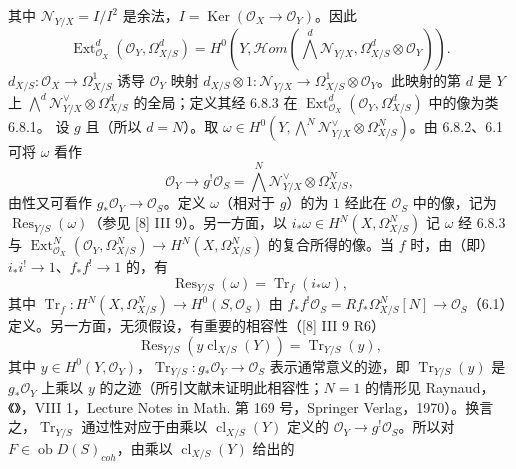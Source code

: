 其中 $\mathcal N_{Y/X}=I/I^2$ 是余法，$I=\operatorname{Ker}(\mathcal O_X\to\mathcal O_Y)$。因此
\[\operatorname{Ext}_{\mathcal O_X}^d(\mathcal O_Y,\Omega^d_{X/S})=H^0(Y,\mathcal Hom(\bigwedge^d\mathcal N_{Y/X},\Omega^d_{X/S}\otimes\mathcal O_Y)).\tag{6.8.3}\]
 $d_{X/S}:\mathcal O_X\to\Omega^1_{X/S}$ 诱导 $\mathcal O_Y$ 映射 $d_{X/S}\otimes1:\mathcal N_{Y/X}\to\Omega^1_{X/S}\otimes\mathcal O_Y$。此映射的第 $d$ 是 $Y$ 上 $\bigwedge^d\mathcal N_{Y/X}^{\vee}\otimes\Omega^d_{X/S}$ 的全局；定义其经 6.8.3 在 $\operatorname{Ext}_{\mathcal O_X}^d(\mathcal O_Y,\Omega^d_{X/S})$ 中的像为类 6.8.1。
设 $g$ 且（所以 $d=N$）。取 $\omega\in H^0(Y,\bigwedge^N\mathcal N_{Y/X}^{\vee}\otimes\Omega^N_{X/S})$。由 6.8.2、6.1 可将 $\omega$ 看作
\[\mathcal O_Y\longrightarrow g^!\mathcal O_S=\bigwedge^N\mathcal N_{Y/X}^{\vee}\otimes\Omega^N_{X/S},\]
由性又可看作 $g_*\mathcal O_Y\to\mathcal O_S$。定义 $\omega$（相对于 $g$）的为 $1$ 经此在 $\mathcal O_S$ 中的像，记为 $\operatorname{Res}_{Y/S}(\omega)$（参见 [8] III 9）。另一方面，以 $i_*\omega\in H^N(X,\Omega^N_{X/S})$ 记 $\omega$ 经 6.8.3 与 $\operatorname{Ext}_{\mathcal O_X}^N(\mathcal O_Y,\Omega^N_{X/S})\to H^N(X,\Omega^N_{X/S})$ 的复合所得的像。当 $f$ 时，由（即）$i_*i^!\to1$、$f_*f^!\to1$ 的，有
\[\operatorname{Res}_{Y/S}(\omega)=\operatorname{Tr}_f(i_*\omega),\tag{6.8.4}\]
其中 $\operatorname{Tr}_f:H^N(X,\Omega^N_{X/S})\to H^0(S,\mathcal O_S)$ 由 $f_*f^!\mathcal O_S=Rf_*\Omega^N_{X/S}[N]\to\mathcal O_S$（6.1）定义。另一方面，无须假设，有重要的相容性（[8] III 9 R6）
\[\operatorname{Res}_{Y/S}(y\operatorname{cl}_{X/S}(Y))=\operatorname{Tr}_{Y/S}(y),\tag{6.8.5}\]
其中 $y\in H^0(Y,\mathcal O_Y)$，$\operatorname{Tr}_{Y/S}:g_*\mathcal O_Y\to\mathcal O_S$ 表示通常意义的迹，即 $\operatorname{Tr}_{Y/S}(y)$ 是 $g_*\mathcal O_Y$ 上乘以 $y$ 的之迹（所引文献未证明此相容性；$N=1$ 的情形见 Raynaud，《》，VIII 1，Lecture Notes in Math. 第 169 号，Springer Verlag，1970）。换言之，$\operatorname{Tr}_{Y/S}$ 通过性对应于由乘以 $\operatorname{cl}_{X/S}(Y)$ 定义的 $\mathcal O_Y\to g^!\mathcal O_S$。所以对 $F\in\operatorname{ob}D(S)_{coh}$，由乘以 $\operatorname{cl}_{X/S}(Y)$ 给出的
